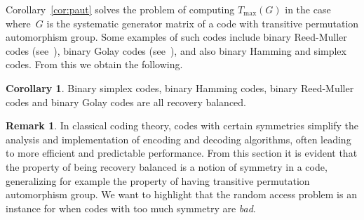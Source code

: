\documentclass[11pt,a4paper,reqno,twoside]{amsart}
\theoremstyle{definition}
\newtheorem{corollary}{Corollary}
\newtheorem{remark}{Remark}
\newcommand{\tmax}{T_{\max}}
\begin{document}
Corollary~\ref{cor:paut} solves the problem of computing $\tmax(G)$ in the case where~$G$ is the systematic generator matrix of a code with transitive permutation automorphism group. Some examples of such codes include binary Reed-Muller codes (see~\cite[Chapter 13, Section 9]{macwilliams1977theory}), binary Golay codes (see~\cite[Chapter 20, Section 1]{macwilliams1977theory}), and also binary Hamming and simplex codes. From this we obtain the following.

\begin{corollary}
    Binary simplex codes, binary Hamming codes, binary Reed-Muller codes and binary Golay codes are all recovery balanced. 
\end{corollary}

\begin{remark}
In classical coding theory, codes with certain symmetries simplify the analysis and implementation of encoding and decoding algorithms, often leading to more efficient and predictable performance. From this section it is evident that the property of being recovery balanced is a notion of symmetry in a code, generalizing for example the property of having transitive permutation automorphism group. We want to highlight that the random access problem is an instance for when codes with too much symmetry are \emph{bad}.
\end{remark}
\end{document}
